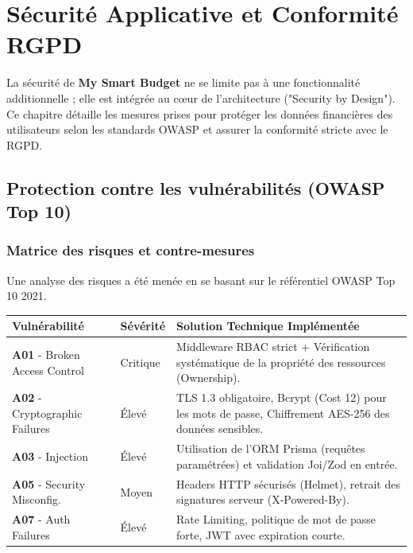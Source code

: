 \chapter{Sécurité Applicative et Conformité RGPD}

La sécurité de \textbf{My Smart Budget} ne se limite pas à une fonctionnalité additionnelle ; elle est intégrée au cœur de l'architecture ("Security by Design"). Ce chapitre détaille les mesures prises pour protéger les données financières des utilisateurs selon les standards OWASP et assurer la conformité stricte avec le RGPD.

\section{Protection contre les vulnérabilités (OWASP Top 10)}



\subsection{Matrice des risques et contre-mesures}

Une analyse des risques a été menée en se basant sur le référentiel OWASP Top 10 2021.

\begin{tcolorbox}[colback=red!5!white,colframe=red!60!black,title=\textbf{Couverture des risques critiques}]
\small
\begin{tabular}{|p{}|p{}|p{}|}
\hline
\textbf{Vulnérabilité} & \textbf{Sévérité} & \textbf{Solution Technique Implémentée} \\
\hline
\textbf{A01} - Broken Access Control & Critique & Middleware RBAC strict + Vérification systématique de la propriété des ressources (Ownership). \\
\hline
\textbf{A02} - Cryptographic Failures & Élevé & TLS 1.3 obligatoire, Bcrypt (Cost 12) pour les mots de passe, Chiffrement AES-256 des données sensibles. \\
\hline
\textbf{A03} - Injection & Élevé & Utilisation de l'ORM Prisma (requêtes paramétrées) et validation Joi/Zod en entrée. \\
\hline
\textbf{A05} - Security Misconfig. & Moyen & Headers HTTP sécurisés (Helmet), retrait des signatures serveur (X-Powered-By). \\
\hline
\textbf{A07} - Auth Failures & Élevé & Rate Limiting, politique de mot de passe forte, JWT avec expiration courte. \\
\hline
\end{tabular}
\end{tcolorbox}

